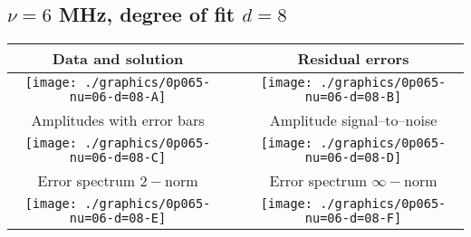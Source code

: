 

% 

\clearpage{}
\break{}

\subsection{$\nu = 6$ MHz, degree of fit $d = 8$}

\begin{table}[h]
    \begin{center}
        \begin{tabular}{ccc}
            Data and solution & \quad & Residual errors \\\hline
            \texttt{[image: ./graphics/0p065-nu=06-d=08-A]} &&
            \texttt{[image: ./graphics/0p065-nu=06-d=08-B]} \\[15pt]
            Amplitudes with error bars && Amplitude signal--to--noise \\\hline
            \texttt{[image: ./graphics/0p065-nu=06-d=08-C]} &&
            \texttt{[image: ./graphics/0p065-nu=06-d=08-D]} \\[15pt]
            Error spectrum $2-$norm && Error spectrum $\infty-$norm \\\hline
            \texttt{[image: ./graphics/0p065-nu=06-d=08-E]} &&
            \texttt{[image: ./graphics/0p065-nu=06-d=08-F]} \\[15pt]
        \end{tabular}
    \end{center}
\label{fig:elev=65, nu=6}
\end{table}



\endinput

